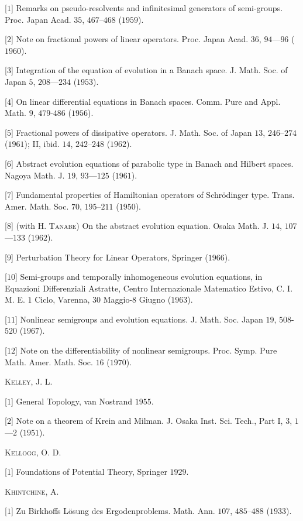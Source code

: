 [$1$] Remarks on pseudo-resolvents and infinitesimal generators of semi-groups. Proc. Japan Acad. $35$, $467$--$468$ ($1959$). 

[$2$] Note on fractional powers of linear operators. Proc. Japan Acad. $36$, $94$---$96$ ($1960$). 

[$3$] Integration of the equation of evolution in a Banach space. J. Math. Soc. of Japan $5$, $208$---$234$ ($1953$). 

[$4$] On linear differential equations in Banach spaces. Comm. Pure and Appl. Math. $9$, $479$-$486$ ($1956$). 

[$5$] Fractional powers of dissipative operators. J. Math. Soc. of Japan $13$, $246$--$274$ ($1961$); II, ibid. $14$, $242$--$248$ ($1962$). 

[$6$] Abstract evolution equations of parabolic type in Banach and Hilbert spaces. Nagoya Math. J. $19$, $93$---$125$ ($1961$). 

[$7$] Fundamental properties of Hamiltonian operators of Schrödinger type. Trans. Amer. Math. Soc. $70$, $195$--$211$ ($1950$). 

[$8$] (with H. \textsc{Tanabe}) On the abstract evolution equation. Osaka Math. J. $14$, $107$---$133$ ($1962$). 

[$9$] Perturbation Theory for Linear Operators, Springer ($1966$). 

[$10$] Semi-groups and temporally inhomogeneous evolution equations, in Equazioni Differenziali Astratte, Centro Internazionale Matematico Estivo, C. I. M. E. $1$ Ciclo, Varenna, $30$ Maggio-$8$ Giugno ($1963$). 

[$11$] Nonlinear semigroups and evolution equations. J. Math. Soc. Japan $19$, $508$-$520$ ($1967$). 

[$12$] Note on the differentiability of nonlinear semigroups. Proc. Symp. Pure Math. Amer. Math. Soc. $16$ ($1970$). 

\textsc{Kelley}, J. L. 

[$1$] General Topology, van Nostrand $1955$. 

[$2$] Note on a theorem of Krein and Milman. J. Osaka Inst. Sci. Tech., Part I, $3$, $1$---$2$ ($1951$). 

\textsc{Kellogg}, O. D. 

[$1$] Foundations of Potential Theory, Springer $1929$. 

\textsc{Khintchine}, A. 

[$1$] Zu Birkhoffs Lösung des Ergodenproblems. Math. Ann. $107$, $485$--$488$ ($1933$). 

